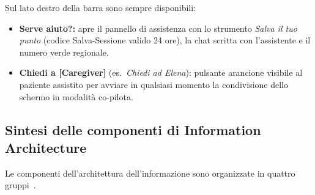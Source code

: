 Sul lato destro della barra sono sempre disponibili:
\begin{itemize}
\item \textbf{Serve aiuto?:} apre il pannello di assistenza con lo strumento \emph{Salva il tuo punto} (codice Salva-Sessione valido 24 ore), la chat scritta con l'assistente e il numero verde regionale.
\item \textbf{Chiedi a [Caregiver]} (es.\ \emph{Chiedi ad Elena}): pulsante arancione visibile al paziente assistito per avviare in qualsiasi momento la condivisione dello schermo in modalità co-pilota.
\end{itemize}

\subsection{Sintesi delle componenti di Information Architecture}

Le componenti dell'architettura dell'informazione sono organizzate in quattro gruppi~\cite{morvilleRosenfeld2006}.

